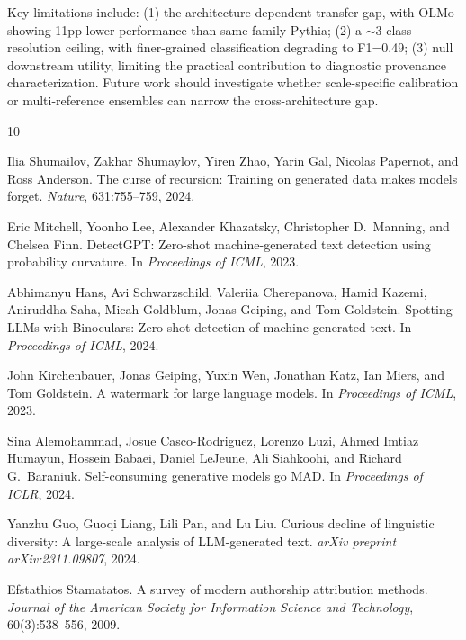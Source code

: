 \documentclass[11pt,a4paper]{article}
\begin{document}
Key limitations include: (1) the architecture-dependent transfer gap, with OLMo showing 11pp lower performance than same-family Pythia; (2) a $\sim$3-class resolution ceiling, with finer-grained classification degrading to F1=0.49; (3) null downstream utility, limiting the practical contribution to diagnostic provenance characterization.
Future work should investigate whether scale-specific calibration or multi-reference ensembles can narrow the cross-architecture gap.

\begin{thebibliography}{10}

Ilia Shumailov, Zakhar Shumaylov, Yiren Zhao, Yarin Gal, Nicolas Papernot, and Ross Anderson.
The curse of recursion: Training on generated data makes models forget.
\emph{Nature}, 631:755--759, 2024.

Eric Mitchell, Yoonho Lee, Alexander Khazatsky, Christopher D.~Manning, and Chelsea Finn.
{DetectGPT}: Zero-shot machine-generated text detection using probability curvature.
In \emph{Proceedings of ICML}, 2023.

Abhimanyu Hans, Avi Schwarzschild, Valeriia Cherepanova, Hamid Kazemi, Aniruddha Saha, Micah Goldblum, Jonas Geiping, and Tom Goldstein.
Spotting {LLMs} with {Binoculars}: Zero-shot detection of machine-generated text.
In \emph{Proceedings of ICML}, 2024.

John Kirchenbauer, Jonas Geiping, Yuxin Wen, Jonathan Katz, Ian Miers, and Tom Goldstein.
A watermark for large language models.
In \emph{Proceedings of ICML}, 2023.

Sina Alemohammad, Josue Casco-Rodriguez, Lorenzo Luzi, Ahmed Imtiaz Humayun, Hossein Babaei, Daniel LeJeune, Ali Siahkoohi, and Richard G.~Baraniuk.
Self-consuming generative models go {MAD}.
In \emph{Proceedings of ICLR}, 2024.

Yanzhu Guo, Guoqi Liang, Lili Pan, and Lu Liu.
Curious decline of linguistic diversity: A large-scale analysis of {LLM}-generated text.
\emph{arXiv preprint arXiv:2311.09807}, 2024.

Efstathios Stamatatos.
A survey of modern authorship attribution methods.
\emph{Journal of the American Society for Information Science and Technology}, 60(3):538--556, 2009.


\end{thebibliography}
\end{document}
